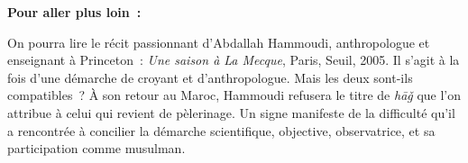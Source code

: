 \textbf{Pour aller plus loin~:}

On pourra lire le récit passionnant d'Abdallah Hammoudi, anthropologue
et enseignant à Princeton~: \emph{Une saison à La Mecque}, Paris, Seuil,
2005. Il s'agit à la fois d'une démarche de croyant et d'anthropologue.
Mais les deux sont-ils compatibles~? À son retour au Maroc, Hammoudi
refusera le titre de \emph{hāǧ} que l'on attribue à celui qui revient de
pèlerinage. Un signe manifeste de la difficulté qu'il a rencontrée à
concilier la démarche scientifique, objective, observatrice, et sa
participation comme musulman.

